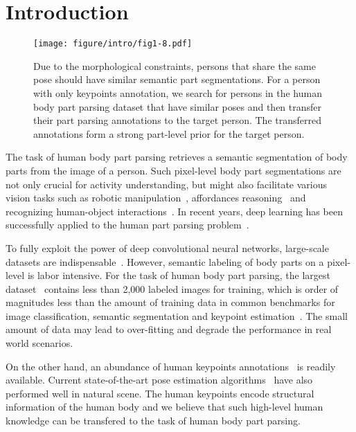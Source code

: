 \documentclass[10pt,twocolumn,letterpaper]{article}
\begin{document}
\section{Introduction}
\begin{figure}[t]
\begin{center}
\texttt{[image: figure/intro/fig1-8.pdf]}
\end{center}
\vspace{-3mm}
   \caption{Due to the morphological constraints, persons that share the same pose should have similar semantic part segmentations. For a person with only keypoints annotation, we search for persons in the human body part parsing dataset that have similar poses and then transfer their part parsing annotations to the target person. The transferred annotations form a strong part-level prior for the target person.}
\label{fig:intro}
\vspace{-3mm}
\end{figure}

The task of human body part parsing retrieves a semantic segmentation of body parts from the image of a person. Such pixel-level body part segmentations are not only crucial for activity understanding, but might also facilitate various vision tasks such as robotic manipulation~\cite{ekvall2004interactive}, affordances reasoning~\cite{koppula2013learning} and recognizing human-object interactions~\cite{deepparts}. In recent years, deep learning has been successfully applied to the human part parsing problem~\cite{chen2015deeplab,chen2016attention,xia2016zoom}.

To fully exploit the power of deep convolutional neural networks, large-scale datasets are indispensable~\cite{imagenet_cvpr09}. However, semantic labeling of body parts on a pixel-level is labor intensive. For the task of human body part parsing, the largest dataset~\cite{chen2014detect} contains less than 2,000 labeled images for training, which is order of magnitudes less than the amount of training data in common benchmarks for image classification, semantic segmentation and keypoint estimation~\cite{imagenet_cvpr09,lin2014microsoft,Everingham15}. The small amount of data may lead to over-fitting and degrade the performance in real world scenarios.

On the other hand, an abundance of human keypoints annotations~\cite{andriluka14cvpr} is readily available. Current state-of-the-art pose estimation algorithms~\cite{newell2016stacked} have also performed well in natural scene. The human keypoints encode structural information of the human body and we believe that such high-level human knowledge can be transfered to the task of human body part parsing.
\end{document}
